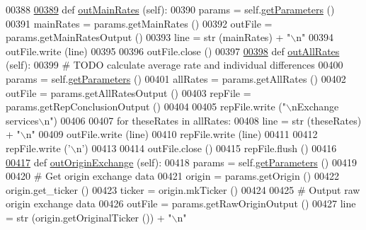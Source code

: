 \begin{DoxyCode}
{00388             
\hyperlink{classe2e_1_1_application_a3e33fd00d85637393d48ea3f7dbd95c7}{00389}     \textcolor{keyword}{def }\hyperlink{classe2e_1_1_application_a3e33fd00d85637393d48ea3f7dbd95c7}{outMainRates} (self):
00390         params = self.\hyperlink{classe2e_1_1_application_ae7bc7b58f19d681635cfa8ae06d9769b}{getParameters} ()
00391         mainRates = params.getMainRates ()
00392         outFile = params.getMainRatesOutput ()
00393         line = str (mainRates) + \textcolor{stringliteral}{"\(\backslash\)n"}
00394         outFile.write (line)
00395         
00396         outFile.close ()
00397     
\hyperlink{classe2e_1_1_application_acd7798aa633d75001b6f6fde556b8a51}{00398}     \textcolor{keyword}{def }\hyperlink{classe2e_1_1_application_acd7798aa633d75001b6f6fde556b8a51}{outAllRates} (self):
00399         \textcolor{comment}{# TODO calculate average rate and individual differences}
00400         params = self.\hyperlink{classe2e_1_1_application_ae7bc7b58f19d681635cfa8ae06d9769b}{getParameters} ()
00401         allRates = params.getAllRates ()
00402         outFile = params.getAllRatesOutput ()
00403         repFile = params.getRepConclusionOutput ()
00404         
00405         repFile.write (\textcolor{stringliteral}{"\(\backslash\)nExchange services\(\backslash\)n"}) 
00406         
00407         \textcolor{keywordflow}{for} theseRates \textcolor{keywordflow}{in} allRates:
00408             line = str (theseRates) + \textcolor{stringliteral}{"\(\backslash\)n"}
00409             outFile.write (line)
00410             repFile.write (line)
00411 
00412         repFile.write (\textcolor{stringliteral}{'\(\backslash\)n'})
00413         
00414         outFile.close ()
00415         repFile.flush ()
00416     
\hyperlink{classe2e_1_1_application_adfad90d64cddb8d751961202264ca489}{00417}     \textcolor{keyword}{def }\hyperlink{classe2e_1_1_application_adfad90d64cddb8d751961202264ca489}{outOriginExchange} (self):
00418         params = self.\hyperlink{classe2e_1_1_application_ae7bc7b58f19d681635cfa8ae06d9769b}{getParameters} ()
00419         
00420         \textcolor{comment}{# Get origin exchange data}
00421         origin = params.getOrigin ()
00422         origin.get\_ticker ()
00423         ticker = origin.mkTicker ()
00424 
00425         \textcolor{comment}{# Output raw origin exchange data}
00426         outFile = params.getRawOriginOutput ()
00427         line = str (origin.getOriginalTicker ()) + \textcolor{stringliteral}{"\(\backslash\)n"}
}
\end{DoxyCode}
